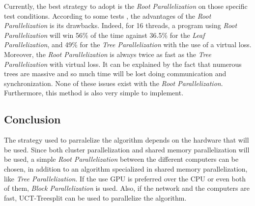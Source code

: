 Currently, the best strategy to adopt is the \emph{Root Parallelization} on those specific test conditions. According to some tests \cite{parallel_comp,tree_root_comp}, the advantages of the \emph{Root Parallelization} is its drawbacks. Indeed, for 16 threads, a program using \emph{Root Parallelization} will win 56\% of the time against 36.5\% for the \emph{Leaf Parallelization}, and 49\% for the \emph{Tree Parallelization} with the use of a virtual loss. Moreover, the \emph{Root Parallelization} is always twice as fast as the \emph{Tree Parallelization} with virtual loss. It can be explained by the fact that numerous trees are massive and so much time will be lost doing communication and synchronization. None of these issues exist with the \emph{Root Parallelization}. Furthermore, this method is also very simple to implement.

\subsection{Conclusion}

The strategy used to parralelize the algorithm depends on the hardware that will be used. Since both cluster parallelization and shared memory parallelization will be used, a simple \emph{Root Parallelization} between the different computers can be chosen, in addition to an algorithm specialized in shared memory parallelization, like \emph{Tree Parallelization}. If the use GPU is preferred over the CPU or even both of them, \emph{Block Parallelization} is used. Also, if the network and the computers are fast, UCT-Treesplit can be used to parallelize the algorithm.
